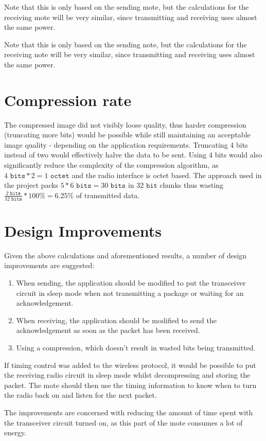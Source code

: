 Note that this is only based on the sending mote, but the calculations for the receiving mote will be very similar, since transmitting and receiving uses almost the same power. 

Note that this is only based on the sending note, but the calculations for the receiving note will be very similar, since transmitting and receiving uses almost the same power.

\section{Compression rate}

The compressed image did not visibly loose quality, thus harder compression (truncating more bits) would be possible while still maintaining an acceptable image quality - depending on the application requirements.
Truncating 4 bits instead of two would effectively halve the data to be sent.
Using 4 bits would also significantly reduce the complexity of the compression algorithm, as $4 \texttt{ bits} * 2= 1 \texttt{ octet}$ and the radio interface is octet based.
The approach used in the project packs $5 * 6\texttt{ bits} = 30\texttt{ bits}$ in $32 \texttt{ bit}$ chunks thus wasting $\frac{2\texttt{ bits}}{32\texttt{ bits}}*100\% = 6.25\%$ of transmitted data.

\section{Design Improvements}

Given the above calculations and aforementioned results, a number of design improvements are suggested: 

\begin{enumerate}
\item When sending, the application should be modified to put the transceiver circuit in sleep mode when not transmitting a package or waiting for an acknowledgement. 
\item When receiving, the application should be modified to send the acknowledgement as soon as the packet has been received.
\item Using a compression, which doesn't result in wasted bits being transmitted.
\end{enumerate} 

If timing control was added to the wireless protocol, it would be possible to put the receiving radio circuit in sleep mode whilst decompressing and storing the packet. The mote should then use the timing information to know when to turn the radio back on and listen for the next packet.

The improvements are concerned with reducing the amount of time spent with the transceiver circuit turned on, as this part of the mote consumes a lot of energy.  
